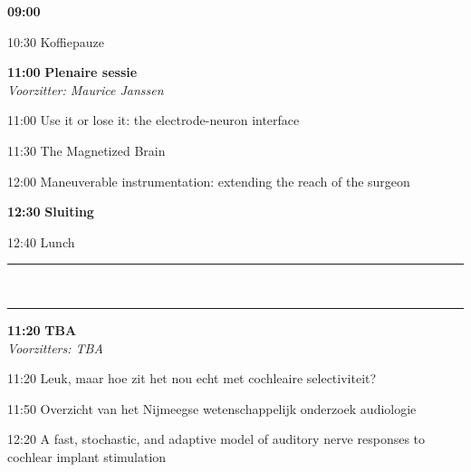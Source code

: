 \documentclass[a4paper,10pt]{report}
\begin{document}
\begin{multicols*}{3}
\columnbreak


\begin{packed_enum}
\item[{\color{Blue} {\textbf{09:00} }}]{ }
        \vfill
\item[10:30] Koffiepauze
        \vfill
\item[\textbf{11:00}] {\textbf{Plenaire sessie}}\\\textit{Voorzitter: Maurice Janssen}
\item[11:00] Use it or lose it: the electrode-neuron interface
\item[11:30] The Magnetized Brain
\item[12:00] Maneuverable instrumentation: extending the reach of the surgeon
        \vfill
\item[\textbf{12:30}] \textbf{Sluiting}
\item[12:40] Lunch
\end{packed_enum}%

\hrule %
\\
\hrule
\vfill

\begin{packed_enum}
\item[\textbf{11:20}] {\textbf{TBA}}\\\textit{Voorzitters: TBA}
\item[11:20] Leuk, maar hoe zit het nou echt met cochleaire selectiviteit?
\item[11:50] Overzicht van het Nijmeegse wetenschappelijk onderzoek audiologie
\item[12:20] A fast, stochastic, and adaptive model of auditory nerve responses to cochlear implant stimulation
\end{packed_enum} %



\end{multicols*}
\end{document}
